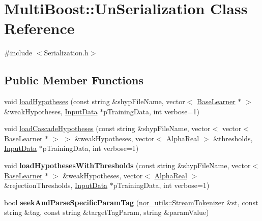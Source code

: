 \hypertarget{classMultiBoost_1_1UnSerialization}{\section{Multi\-Boost\-:\-:Un\-Serialization Class Reference}
\label{classMultiBoost_1_1UnSerialization}
}


{\ttfamily \#include $<$Serialization.\-h$>$}

\subsection*{Public Member Functions}
\begin{DoxyCompactItemize}
\item 
void \hyperlink{classMultiBoost_1_1UnSerialization_ad99590df2e49aa62ac8dc996b6523ff7}{load\-Hypotheses} (const string \&shyp\-File\-Name, vector$<$ \hyperlink{classMultiBoost_1_1BaseLearner}{Base\-Learner} $\ast$ $>$ \&weak\-Hypotheses, \hyperlink{classMultiBoost_1_1InputData}{Input\-Data} $\ast$p\-Training\-Data, int verbose=1)
\item 
void \hyperlink{classMultiBoost_1_1UnSerialization_ab5ce803d9b61f0249384130bc4fe4a84}{load\-Cascade\-Hypotheses} (const string \&shyp\-File\-Name, vector$<$ vector$<$ \hyperlink{classMultiBoost_1_1BaseLearner}{Base\-Learner} $\ast$ $>$ $>$ \&weak\-Hypotheses, vector$<$ \hyperlink{Defaults_8h_a80184c4fd10ab70a1a17c5f97dcd1563}{Alpha\-Real} $>$ \&thresholds, \hyperlink{classMultiBoost_1_1InputData}{Input\-Data} $\ast$p\-Training\-Data, int verbose=1)
\item 
\hypertarget{classMultiBoost_1_1UnSerialization_a514c986d787cf0760f54eb5668ba9b3f}{void {\bfseries load\-Hypotheses\-With\-Thresholds} (const string \&shyp\-File\-Name, vector$<$ \hyperlink{classMultiBoost_1_1BaseLearner}{Base\-Learner} $\ast$ $>$ \&weak\-Hypotheses, vector$<$ \hyperlink{Defaults_8h_a80184c4fd10ab70a1a17c5f97dcd1563}{Alpha\-Real} $>$ \&rejection\-Thresholds, \hyperlink{classMultiBoost_1_1InputData}{Input\-Data} $\ast$p\-Training\-Data, int verbose=1)}\label{classMultiBoost_1_1UnSerialization_a514c986d787cf0760f54eb5668ba9b3f}

\item 
\hypertarget{classMultiBoost_1_1UnSerialization_aa201af9a422ef8c88b584c29a84face9}{bool {\bfseries seek\-And\-Parse\-Specific\-Param\-Tag} (\hyperlink{classnor__utils_1_1StreamTokenizer}{nor\-\_\-utils\-::\-Stream\-Tokenizer} \&st, const string \&tag, const string \&target\-Tag\-Param, string \&param\-Value)}\label{classMultiBoost_1_1UnSerialization_aa201af9a422ef8c88b584c29a84face9}

\end{DoxyCompactItemize}
